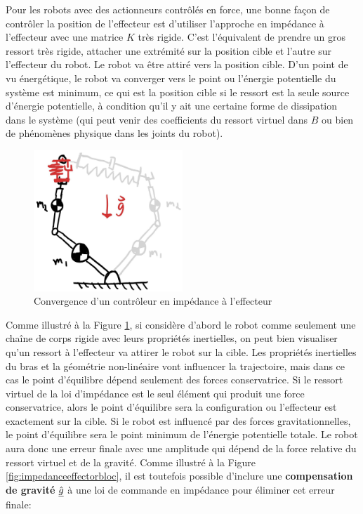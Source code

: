 Pour les robots avec des actionneurs contrôlés en force, une bonne façon de contrôler la position de l'effecteur est d'utiliser l'approche en impédance à l'effecteur avec une matrice $K$ très rigide. C'est l'équivalent de prendre un gros ressort très rigide, attacher une extrémité sur la position cible et l'autre sur l'effecteur du robot. Le robot va être attiré vers la position cible. D'un point de vu énergétique, le robot va converger vers le point ou l'énergie potentielle du système est minimum, ce qui est la position cible si le ressort est la seule source d'énergie potentielle, à condition qu'il y ait une certaine forme de dissipation dans le système (qui peut venir des coefficients du ressort virtuel dans $B$ ou bien de phénomènes physique dans les joints du robot). 
\begin{figure}[h]
	\centering
		\includegraphics[width=0.5\textwidth]{fig/impedancecontroltaskconvergencegeo.jpg}
	\caption{Convergence d'un contrôleur en impédance à l'effecteur}
	\label{fig:impedancecontroltaskconvergencegeo}
\end{figure}
%
Comme illustré à la Figure \ref{fig:impedancecontroltaskconvergencegeo}, si considère d'abord le robot comme seulement une chaîne de corps rigide avec leurs propriétés inertielles, on peut bien visualiser qu'un ressort à l'effecteur va attirer le robot sur la cible. Les propriétés inertielles du bras et la géométrie non-linéaire vont influencer la trajectoire, mais dans ce cas le point d'équilibre dépend seulement des forces conservatrice. Si le ressort virtuel de la loi d'impédance est le seul élément qui produit une force conservatrice, alors le point d'équilibre sera la configuration ou l'effecteur est exactement sur la cible. Si le robot est influencé par des forces gravitationnelles, le point d'équilibre sera le point minimum de l'énergie potentielle totale. Le robot aura donc une erreur finale avec une amplitude qui dépend de la force relative du ressort virtuel et de la gravité. Comme illustré à la Figure \ref{fig:impedanceeffectorbloc}, il est toutefois possible d'inclure une \textbf{compensation de gravité} $\underline{\hat{g}}$ à une loi de commande en impédance pour éliminer cet erreur finale:
